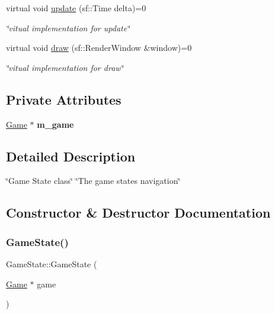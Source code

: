 \begin{DoxyCompactItemize}
\mbox{\label{classGameState_ab1fe4312f7ce88e7dc11f9935dee67d1}} 
virtual void \hyperlink{classGameState_ab1fe4312f7ce88e7dc11f9935dee67d1}{update} (sf\+::\+Time delta)=0
\begin{DoxyCompactList}\small\item\em \char`\"{}vitual implementation for update\char`\"{} \end{DoxyCompactList}\item 
\mbox{\label{classGameState_a3131198be0dee9ad887fc48a02d626e3}} 
virtual void \hyperlink{classGameState_a3131198be0dee9ad887fc48a02d626e3}{draw} (sf\+::\+Render\+Window \&window)=0
\begin{DoxyCompactList}\small\item\em \char`\"{}vitual implementation for draw\char`\"{} \end{DoxyCompactList}\end{DoxyCompactItemize}
\subsection*{Private Attributes}
\begin{DoxyCompactItemize}
\item 
\mbox{\label{classGameState_a7e0742cb5f15d4ed5090108cb6308852}} 
\hyperlink{classGame}{Game} $\ast$ {\bfseries m\+\_\+game}
\end{DoxyCompactItemize}


\subsection{Detailed Description}
\char`\"{}\+Game State class\char`\"{}  \char`\"{}\+The game states navigation\char`\"{} 

\subsection{Constructor \& Destructor Documentation}
\mbox{\label{classGameState_ab0a50af4416535fc9ed4462015de9bc3}} 
\subsubsection{\texorpdfstring{Game\+State()}{GameState()}}
{\footnotesize\ttfamily Game\+State\+::\+Game\+State (\begin{DoxyParamCaption}\item[{\hyperlink{classGame}{Game} $\ast$}]{game }\end{DoxyParamCaption})}



